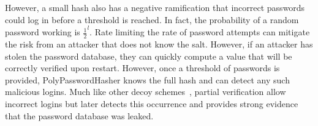 However, a small hash also has a negative ramification that
incorrect passwords could log in before a threshold is reached.   In fact,
the probability of a random password working is $\frac{1}{2}^l$.   Rate
limiting the rate of password attempts can mitigate the risk from an attacker
that does not know the salt.   However, if an attacker has stolen the password 
database, they can quickly compute a value that will be correctly verified 
upon restart.  However, once a threshold of passwords is provided,
PolyPasswordHasher knows the full hash and can detect any such
malicious logins.   Much like other decoy schemes~\cite{juels2013honeywords,
Kontaxis_CCS_2013}, partial verification allow incorrect logins but
later detects this occurrence and provides strong evidence that the password
database was leaked.






